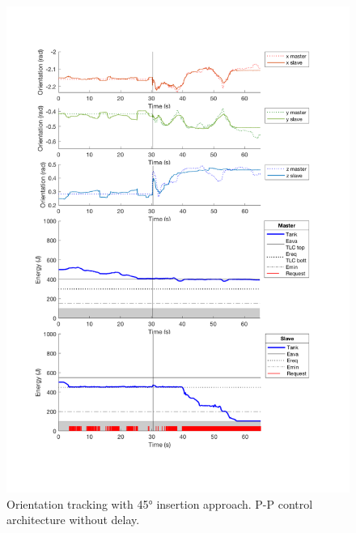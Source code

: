 \begin{center}
	\begin{figure}
		\includegraphics[width=\textwidth, keepaspectratio]{plots/pp45/Orientation.pdf}
		\caption{Orientation tracking with 45° insertion approach. P-P control architecture without delay.}
		\label{graph:pp45/Orientation}
	\end{figure}
\end{center}

